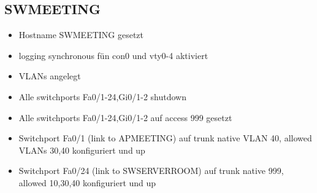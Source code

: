 \documentclass[11pt]{article}
\begin{document}
\subsection{SWMEETING}
\label{sec:orgdf002a0}
\begin{itemize}
\item Hostname SWMEETING gesetzt
\item logging synchronous fün con0 und vty0-4 aktiviert
\item VLANs angelegt
\item Alle switchports Fa0/1-24,Gi0/1-2 shutdown
\item Alle switchports Fa0/1-24,Gi0/1-2 auf access 999 gesetzt
\item Switchport Fa0/1 (link to APMEETING) auf trunk native VLAN 40, allowed VLANs 30,40 konfiguriert und up
\item Switchport Fa0/24 (link to SWSERVERROOM) auf trunk native 999, allowed 10,30,40 konfiguriert und up
\end{itemize}
\end{document}

